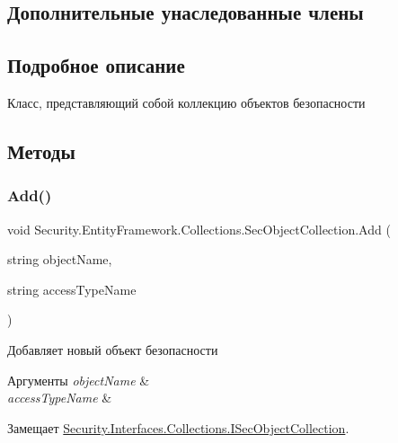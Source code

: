 \subsection*{Дополнительные унаследованные члены}


\subsection{Подробное описание}
Класс, представляющий собой коллекцию объектов безопасности 



\subsection{Методы}
\mbox{\label{class_security_1_1_entity_framework_1_1_collections_1_1_sec_object_collection_a4a16dfa2ff30c3c55b8e16e90df074c2}} 
\subsubsection{\texorpdfstring{Add()}{Add()}\hspace{0.1cm}{\footnotesize\ttfamily [1/2]}}
{\footnotesize\ttfamily void Security.\+Entity\+Framework.\+Collections.\+Sec\+Object\+Collection.\+Add (\begin{DoxyParamCaption}\item[{string}]{object\+Name,  }\item[{string}]{access\+Type\+Name }\end{DoxyParamCaption})}



Добавляет новый объект безопасности 


\begin{DoxyParams}{Аргументы}
{\em object\+Name} & \\
\hline
{\em access\+Type\+Name} & \\
\hline
\end{DoxyParams}


Замещает \hyperlink{interface_security_1_1_interfaces_1_1_collections_1_1_i_sec_object_collection_ac93caa6a02f45242baab65dbef985c23}{Security.\+Interfaces.\+Collections.\+I\+Sec\+Object\+Collection}.

